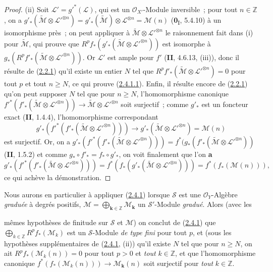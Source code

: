 \begin{proof}
(ii) Soit $\mathcal L'=g'^*(\mathcal L)$, qui est un
$\mathcal O_{X'}$-Module inversible~; pour tout $n\in\mathbb Z$, on a
$g'_*(\widetilde{\mathcal M}\otimes\mathcal L'^{\otimes n})
=g'_*(\widetilde{\mathcal M})\otimes\mathcal L^{\otimes n}
=\mathcal M(n)$
(\textbf{0}\textsubscript{I}, 5.4.10) à un isomorphisme près~; on peut appliquer
à $\widetilde{\mathcal M}\otimes\mathcal L'^{\otimes n}$ le
raisonnement fait dans (i) pour $\widetilde{\mathcal M}$, qui prouve que
$R^pf_*(g'_*(\widetilde{\mathcal M}\otimes\mathcal L'^{\otimes n}))$
est isomorphe à
$g_*(R^pf'_*(\widetilde{\mathcal M}\otimes\mathcal L'^{\otimes n}))$.
Or $\mathcal L'$ est ample pour $f'$ (\textbf{II}, 4.6.13, (iii)), donc il résulte
de (\hyperref[III.2.2.1-fr]{2.2.1}) qu'il existe un entier $N$ tel que
$R^pf'_*(\widetilde{\mathcal M}\otimes\mathcal L'^{\otimes n})=0$
pour tout $p$ et tout $n\geq N$, ce qui prouve
(\hyperref[III.2.4.1.1-fr]{2.4.1.1}). Enfin, il résulte encore de
(\hyperref[III.2.2.1-fr]{2.2.1}) qu'on peut supposer $N$ tel que pour
$n\geq N$, l'homomorphisme canonique
$f'^*(f'_*(\widetilde{\mathcal M}\otimes\mathcal L'^{\otimes n}))
\longrightarrow\widetilde{\mathcal M}\otimes\mathcal L'^{\otimes n}$
soit surjectif~; comme $g'_*$ est un foncteur exact (\textbf{II}, 1.4.4),
l'homomorphisme correspondant
\[
g'_*(f'^*(f'_*(\widetilde{\mathcal M}\otimes
\mathcal L'^{\otimes n})))
\longrightarrow
g'_*(\widetilde{\mathcal M}\otimes\mathcal L'^{\otimes n})
=\mathcal M(n)
\]
est surjectif. Or, on a
$g'_*(f'^*(f'_*(\widetilde{\mathcal M}\otimes
\mathcal L'^{\otimes n})))
=f^*(g_*(f'_*(\widetilde{\mathcal M}\otimes
\mathcal L'^{\otimes n}))$
(\textbf{II}, 1.5.2) et comme $g_*\circ f'_* = f_*\circ g'_*$, on voit
finalement que l'on \textbf{a}
\[
g'_*(f'^*(f'_*(\widetilde{\mathcal M}\otimes\mathcal L'^{\otimes n})))
=f^*(f_*(g'_*(\widetilde{\mathcal M}\otimes
\mathcal L'^{\otimes n})))=f^*(f_*(\mathcal M(n))),
\]
ce qui achève la démonstration.
\end{proof}

\begin{env}[2.4.2]
\label{III.2.4.2-fr}
Nous aurons en particulier à appliquer
(\hyperref[III.2.4.1-fr]{2.4.1}) lorsque $\mathcal S$ est une
$\mathcal O_Y$-Algèbre \emph{graduée} à degrés positifs,
$\mathcal M=\bigoplus_{\boldsymbol{k}\in\mathbb Z}\mathcal M_{\boldsymbol{k}}$ un
$\mathcal S'$-Module \emph{gradué}. Alors (avec les

mêmes hypothèses de finitude sur $\mathcal S$ et $\mathcal M$) on conclut
de (\hyperref[III.2.4.1-fr]{2.4.1}) que
$\bigoplus_{k\in\mathbb Z}R^pf_*(\mathcal M_k)$
est un $\mathcal S$-Module \emph{de type fini} pour tout $p$, et (sous les
hypothèses supplémentaires de (\hyperref[III.2.4.1-fr]{2.4.1}, (ii))
qu'il existe $N$ tel que pour $n\geq N$, on ait
$R^pf_*(\mathcal M_k(n))=0$ pour tout $p>0$ et \emph{tout} $k\in\mathbb Z$, et
que l'homomorphisme canonique
$f^*(f_*(\mathcal M_k(n)))\to\mathcal M_{\boldsymbol{k}}(n)$ soit surjectif pour \emph{tout}
$k\in\mathbb Z$.
\end{env}

